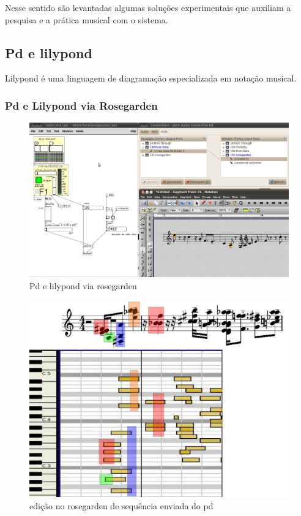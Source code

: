 \documentclass{ppgmus}
\begin{document}
Nesse sentido são levantadas algumas soluções experimentais que auxiliam a pesquisa e 
a prática musical com o sistema.


\subsection{Pd e lilypond}

Lilypond é uma linguagem de diagramação especializada
em notação musical.



\subsubsection{Pd e Lilypond via Rosegarden}

\begin{figure}
\includegraphics[scale=.6]{audio2midi}
\caption{Pd e lilypond via rosegarden}
\label{pdlilypond1}
\end{figure} 


\begin{figure}
\includegraphics[scale=.6]{teste-noquantize}
\caption{edição no rosegarden de sequência enviada do pd}
\label{fft-subpatch}
\end{figure} 
\end{document}
